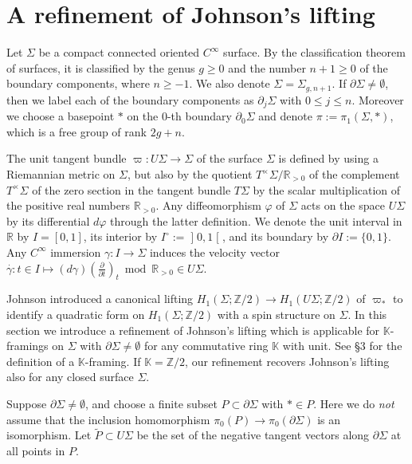 \documentclass[a4paper,12pt, twoside]{amsart}
\theoremstyle{definition}
\theoremstyle{remark}
\numberwithin{equation}{section}
\newcommand\bK{{\mathbb{K}}}
\newcommand\bR{{\mathbb{R}}}
\newcommand\bZ{{\mathbb{Z}}}
\newcommand\pa{\partial}
\begin{document}
\section{A refinement of Johnson's lifting}\label{sec:lift}
Let $\Sigma$ be a compact connected oriented $C^\infty$ surface. 
By the classification theorem of surfaces, it is classified by the genus $g \geq 0$ and the number $n+1 \geq 0$ of the boundary components, where $n \geq -1$. We also denote $\Sigma = \Sigma_{g,n+1}$. 
If $\pa\Sigma \neq \emptyset$, then we label each of the boundary components as $\pa_j\Sigma$ with $0 \leq j \leq n$. Moreover we choose a basepoint $\ast$ on the $0$-th boundary $\pa_0\Sigma$ and denote $\pi := \pi_1(\Sigma, *)$, which is a free group of rank $2g+n$. 
\par
The unit tangent bundle $\varpi: U\Sigma \to \Sigma$ of the surface $\Sigma$ is defined by using a Riemannian metric on $\Sigma$, but also by the quotient $T^\times \Sigma/\bR_{>0}$ of the complement  $T^\times \Sigma$ of the zero section in the tangent bundle $T\Sigma$ by the scalar multiplication of the positive real numbers $\bR_{>0}$. 
Any diffeomorphism $\varphi$ of $\Sigma$ acts on the space $U\Sigma$  by its differential $d\varphi$ through the latter definition.
We denote the unit interval in $\bR$ by $I = [0,1]$, its interior by $I^\circ := \mathopen]0,1\mathclose[$, and its boundary by $\pa I := \{0,1\}$. 
Any $C^\infty$ immersion $\gamma: I \to \Sigma$ 
induces the velocity vector $\overset\cdot\gamma: t\in I \mapsto (d\gamma)\left(\frac{\pa}{\pa t}\right)_t \bmod \bR_{>0} \in U\Sigma$. 
\par
Johnson \cite{J80a} introduced a canonical lifting 
$H_1(\Sigma; \bZ/2) \to H_1(U\Sigma; \bZ/2)$ of $\varpi_*$
 to identify a quadratic form on $H_1(\Sigma; \bZ/2)$ with a spin structure on $\Sigma$. 
In this section we introduce a refinement of Johnson's lifting which is applicable for $\bK$-framings on $\Sigma$ with $\pa\Sigma \neq \emptyset$ for any commutative ring $\bK$ with unit. See \S3 for the definition of a $\bK$-framing.  If $\bK = \bZ/2$, our refinement recovers Johnson's lifting also for any closed surface $\Sigma$. 
\par
Suppose $\pa\Sigma \neq \emptyset$, and choose a finite subset $P \subset \pa\Sigma$ with $\ast \in P$. Here we do {\it not} assume that the inclusion homomorphism $\pi_0(P) \to \pi_0(\pa\Sigma)$ is an isomorphism. 
Let $\tilde P \subset U\Sigma$ be the set of the negative tangent vectors along $\pa \Sigma$ at all points in $P$. 
\end{document}
